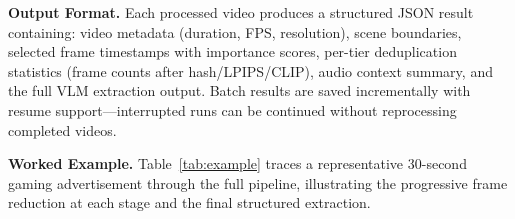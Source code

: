 \documentclass[sigconf,nonacm]{acmart}
\begin{document}
\textbf{Output Format.} Each processed video produces a structured JSON result containing: video metadata (duration, FPS, resolution), scene boundaries, selected frame timestamps with importance scores, per-tier deduplication statistics (frame counts after hash/LPIPS/CLIP), audio context summary, and the full VLM extraction output. Batch results are saved incrementally with resume support---interrupted runs can be continued without reprocessing completed videos.

\textbf{Worked Example.} Table~\ref{tab:example} traces a representative 30-second gaming advertisement through the full pipeline, illustrating the progressive frame reduction at each stage and the final structured extraction.

\begin{table}[t]
\centering
\caption{End-to-end processing example for a 30-second gaming advertisement (``Sword of Chaos'', 30\,FPS, 981 total frames).}
\label{tab:example}
\end{table}
\end{document}
